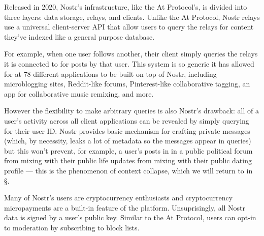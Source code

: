 Released in 2020, Nostr's infrastructure, like the At Protocol's, is divided into three layers: data storage, relays, and clients.
Unlike the At Protocol, Nostr relays use a universal client-server API that allow users to query the relays for content they've indexed like a general purpose database.

For example, when one user follows another, their client simply queries the relays it is connected to for posts by that user.
This system is so generic it has allowed for at 78 different applications to be built on top of Nostr, including microblogging sites, Reddit-like forums, Pinterest-like collaborative tagging, an app for collaborative music remixing, and more.

However the flexibility to make arbitrary queries is also Nostr's drawback:
all of a user's activity across all client applications can be revealed by simply querying for their user ID.
Nostr provides basic mechanism for crafting private messages (which, by necessity, leaks a lot of metadata so the messages appear in queries)
but this won't prevent, for example, a user's posts in in a public political forum from mixing with their public life updates from mixing with their public dating profile --- this is the phenomenon of context collapse, which we will return to in \S.

Many of Nostr's users are cryptocurrency enthusiasts and cryptocurrency micropayments are a built-in feature of the platform. Unsuprisingly, all Nostr data is signed by a user's public key.
Similar to the At Protocol, users can opt-in to moderation by subscribing to block lists.





